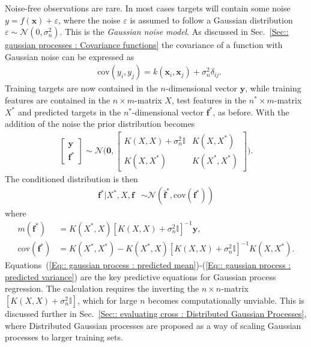 \documentclass[twoside,english]{uiofysmaster}
\begin{document}
{Noise-free observations are rare. In most cases targets will contain some noise $y = f(\textbf{x}) + \varepsilon$, where the noise $\varepsilon$ is assumed to follow a Gaussian distribution $\varepsilon \sim \mathcal{N}(0, \sigma_n^2)$. This is the \textit{Gaussian noise model}. As discussed in Sec.~\ref{Sec:: gaussian processes : Covariance functions} the covariance of a function with Gaussian noise can be expressed as
\begin{align}
&\text{cov}(y_i, y_j) = k(\textbf{x}_i, \textbf{x}_j) + \sigma_n^2 \delta_{ij}.
\end{align}
Training targets are now contained in the $n$-dimensional vector $\textbf{y}$, while training features are contained in the $n \times m$-matrix $X$, test features in the $n^* \times m$-matrix $X^*$ and predicted targets in the $n^*$-dimensional vector $\textbf{f}^*$, as before. With the addition of the noise the prior distribution becomes
\begin{align}
\begin{bmatrix}
\textbf{y}\\
\textbf{f}^*
\end{bmatrix}
\sim 
\mathcal{N} \Bigg(
\boldsymbol{0},
\begin{bmatrix}
K(X, X) + \sigma_n^2 \mathbb{I} & K(X, X^*)\\
K(X, X^*) & K(X^*, X^*)
\end{bmatrix}
 \Bigg).
\end{align}
The conditioned distribution is then 
\begin{align}
\textbf{f}^* \big| X^*, X, \textbf{f} & \sim \mathcal{N}(\bar{\textbf{f}}^*, \text{cov}(\textbf{f}^*))
\end{align}
where
\begin{align}
m(\textbf{f}^*) &= K(X^*, X) [K(X, X) + \sigma_n^2 \mathbb{I}]^{-1} \textbf{y},\label{Eq:: gaussian process : predicted mean}\\ 
\text{cov} (\textbf{f}^*) &= K(X^*, X^*) - K(X^*, X)[K(X, X) + \sigma_n^2 \mathbb{I}]^{-1} K(X, X^*). \label{Eq:: gaussian process : predicted variance}
\end{align}
Equations~(\ref{Eq:: gaussian process : predicted mean})-(\ref{Eq:: gaussian process : predicted variance}) are the key predictive equations for Gaussian process regression. The calculation requires the inverting the $n \times n$-matrix $[K(X,X) + \sigma_n^2 \mathbb{I}]$, which for large $n$ becomes computationally unviable. This is discussed further in Sec.~\ref{Sec:: evaluating cross : Distributed Gaussian Processes}, where Distributed Gaussian processes are proposed as a way of scaling Gaussian processes to larger training sets.

}
\end{document}
